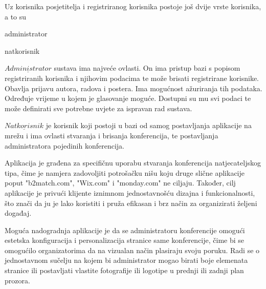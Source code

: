 		Uz korisnika posjetitelja i registriranog korisnika postoje još dvije vrste korisnika, a to su
		\begin{packed_item}
			\item administrator
			\item natkorisnik
		\end{packed_item}
		
		$\underline{Administrator}$ sustava ima najveće ovlasti. On ima pristup bazi s popisom registriranih korisnika i njihovim podacima te može brisati registrirane korisnike. Obavlja prijavu autora, radova i postera. Ima mogućnost ažuriranja tih podataka. Određuje vrijeme u kojem je glasovanje moguće. Dostupni su mu svi podaci te može definirati sve potrebne uvjete za ispravan rad sustava.
		
		$\underline{Natkorisnik}$ je korisnik koji postoji u bazi od samog postavljanja aplikacije na mrežu i ima ovlasti stvaranja i brisanja konferencija, te postavljanja administratora pojedinih konferencija.
		
		Aplikacija je građena za specifičnu uporabu stvaranja konferencija natjecateljskog tipa, čime je namjera zadovoljiti potrošačku nišu koju druge slične aplikacije poput "b2match.com", "Wix.com" i "monday.com" ne ciljaju. Također, cilj aplikacije je privući klijente iznimnom jednostavnošću dizajna i funkcionalnosti, što znači da ju je lako koristiti i pruža efikasan i brz način za organizirati željeni događaj.
		
		Moguća nadogradnja aplikacije je da se administratoru konferencije omogući estetska konfiguracija i personalizacija stranice same konferencije, čime bi se omogućilo organizatorima da na vizualan način plasiraju svoju poruku. Radi se o jednostavnom sučelju na kojem bi administrator mogao birati boje elemenata stranice ili postavljati vlastite fotografije ili logotipe u prednji ili zadnji plan prozora.

		\eject
		

